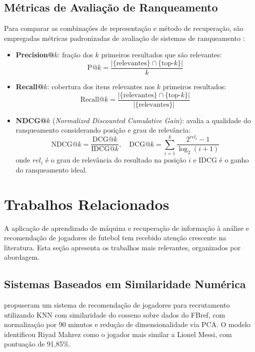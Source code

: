 \documentclass[portuguese]{sbc2025}
\begin{document}
\subsection{Métricas de Avaliação de Ranqueamento}

Para comparar as combinações de representação e método de recuperação, são empregadas
métricas padronizadas de avaliação de sistemas de ranqueamento \citep{manning2008}:

\begin{itemize}
  \item \textbf{Precision@$k$}: fração dos $k$ primeiros resultados que são relevantes:
        \[
          \text{P@}k = \frac{|\{\text{relevantes}\} \cap \{\text{top-}k\}|}{k}
        \]

  \item \textbf{Recall@$k$}: cobertura dos itens relevantes nos $k$ primeiros
        resultados:
        \[
          \text{Recall@}k =
          \frac{|\{\text{relevantes}\} \cap \{\text{top-}k\}|}{|\{\text{relevantes}\}|}
        \]

  \item \textbf{NDCG@$k$} (\textit{Normalized Discounted Cumulative Gain}): avalia
        a qualidade do ranqueamento considerando posição e grau de relevância:
        \[
          \text{NDCG@}k = \frac{\text{DCG@}k}{\text{IDCG@}k}, \quad
          \text{DCG@}k = \sum_{i=1}^{k} \frac{2^{rel_i} - 1}{\log_2(i+1)}
        \]
        onde $rel_i$ é o grau de relevância do resultado na posição $i$ e IDCG é o
        ganho do ranqueamento ideal.
\end{itemize}

\section{Trabalhos Relacionados}
\label{sec:related}

A aplicação de aprendizado de máquina e recuperação de informação à análise e
recomendação de jogadores de futebol tem recebido atenção crescente na literatura.
Esta seção apresenta os trabalhos mais relevantes, organizados por abordagem.

\subsection{Sistemas Baseados em Similaridade Numérica}

\citet{ijai2025} propuseram um sistema de recomendação de jogadores para recrutamento
utilizando KNN com similaridade do cosseno sobre dados do FBref, com normalização por
90 minutos e redução de dimensionalidade via PCA. O modelo identificou Riyad Mahrez
como o jogador mais similar a Lionel Messi, com pontuação de 91,85\%.
\end{document}
